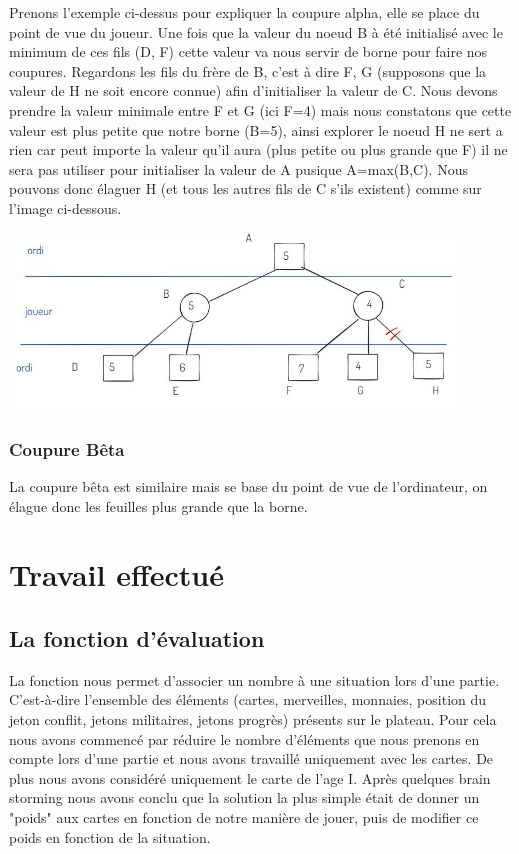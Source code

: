 \documentclass[a4paper, 12pt, french]{article}
\begin{document}
	Prenons l'exemple ci-dessus pour expliquer la coupure alpha, elle se place du point de vue du joueur.
	Une fois que la valeur du noeud B à été initialisé avec le minimum de ces fils (D, F) cette valeur va nous
	servir de borne pour faire nos coupures. Regardons les fils du frère de B, c'est à dire F, G (supposons que
	la valeur de H ne soit encore connue) afin d'initialiser la valeur de C. Nous devons prendre la valeur minimale
	entre F et G (ici F=4) mais nous constatons que cette valeur est plus petite que notre borne (B=5), ainsi explorer
	le noeud H ne sert a rien car peut importe la valeur qu'il aura (plus petite ou plus grande que F) il ne sera pas
	utiliser pour initialiser la valeur de A pusique A=max(B,C). Nous pouvons donc élaguer H (et tous les autres fils
	de C s'ils existent) comme sur l'image ci-dessous.

	\includegraphics[width=12cm]{images/elagageAlphaSuite.JPG}

	\subsubsection{Coupure Bêta}
	La coupure bêta est similaire mais se base du point de vue de l'ordinateur, on élague donc les
	feuilles plus grande que la borne\cite{wiki_7_wonder}.

	\section{Travail effectué}
	\subsection{La fonction d'évaluation}
	La fonction nous permet d'associer un nombre à une situation lors d'une partie. C'est-à-dire l'ensemble
	des éléments (cartes, merveilles, monnaies, position du jeton conflit, jetons militaires, jetons progrès)
	présents sur le plateau. Pour cela nous avons commencé par réduire le nombre d'éléments que nous prenons en
	compte lors d'une partie et nous avons travaillé uniquement avec les cartes. De plus nous avons considéré
	uniquement le carte de l'age I. Après quelques brain storming nous avons conclu que la solution la
	plus simple était de donner un "poids" aux cartes en fonction de notre manière de jouer, puis de modifier ce poids
	en fonction de la situation.
\end{document}
